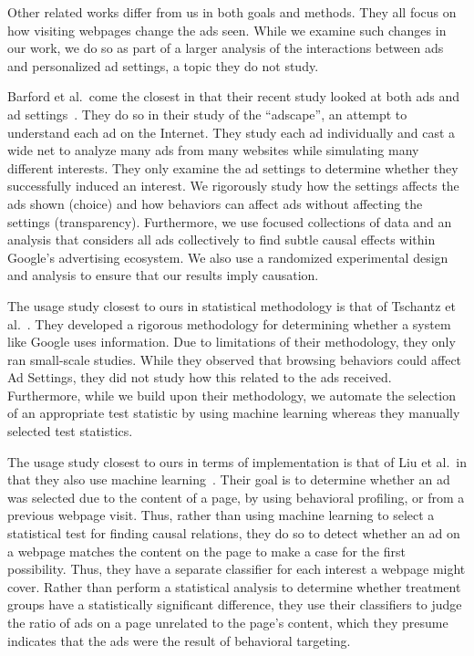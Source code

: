 \documentclass{article}
\begin{document}
Other related works differ from us in both goals and methods.  They all focus on how visiting webpages change the ads seen.  While we examine such changes in our work, we do so as part of a larger analysis of the interactions between ads and personalized ad settings, a topic they do not study.


Barford et al.\ come the closest in that their recent study looked at both ads and ad settings~\cite{barford14www}.
They do so in their study of the ``adscape'', an attempt to understand each ad on the Internet.
They study each ad individually and cast a wide net to analyze many ads from many websites while simulating many different interests.
They only examine the ad settings to determine whether they successfully induced an interest.
We rigorously study how the settings affects the ads shown (choice) and how behaviors can affect ads without affecting the settings (transparency).
Furthermore, we use focused collections of data and an analysis that considers all ads collectively to find subtle causal effects within Google's advertising ecosystem.
We also use a randomized experimental design and analysis to ensure that our results imply causation.




The usage study closest to ours in statistical methodology is that of Tschantz et al.~\cite{tschantz14arxiv}. 
They developed a rigorous methodology for determining whether a system like Google uses information.
Due to limitations of their methodology, they only ran small-scale studies.
While they observed that browsing behaviors could affect Ad Settings, they did not study how this related to the ads received.
Furthermore, while we build upon their methodology, we automate the selection of an appropriate test statistic by using machine learning whereas they manually selected test statistics.



The usage study closest to ours in terms of implementation is that of Liu et al.\ in that they also use machine learning~\cite{liu13hotnets}.
Their goal is to determine whether an ad was selected due to the content of a page, by using behavioral profiling, or from a previous webpage visit.
Thus, rather than using machine learning to select a statistical test for finding causal relations, they do so to detect whether an ad on a webpage matches the content on the page to make a case for the first possibility.  Thus, they have a separate classifier for each interest a webpage might cover.  Rather than perform a statistical analysis to determine whether treatment groups have a statistically significant difference, they use their classifiers to judge the ratio of ads on a page unrelated to the page's content, which they presume indicates that the ads were the result of behavioral targeting.
\end{document}
